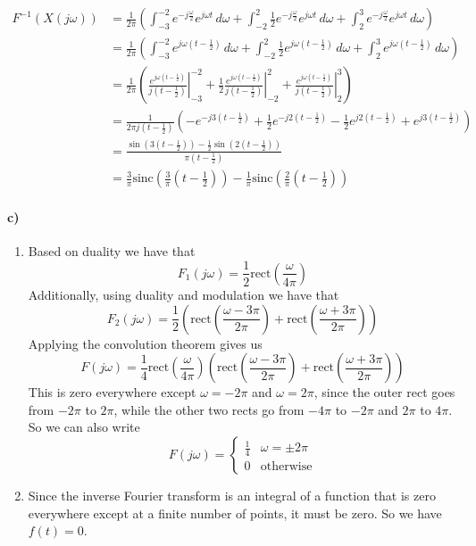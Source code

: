 \documentclass[12pt]{article}
\begin{document}
\begin{align*}
    F^{-1}(X(j\omega))&=\frac{1}{2\pi}\left(\int_{-3}^{-2} e^{-j\frac{\omega}{2}} e^{j\omega t}\,d\omega + \int_{-2}^2 \frac{1}{2}e^{-j\frac{\omega}{2}} e^{j\omega t}\,d\omega
    + \int_2^3 e^{-j\frac{\omega}{2}} e^{j\omega t}\,d\omega\right)\\
    &=\frac{1}{2\pi}\left(\int_{-3}^{-2} e^{j\omega \left(t-\frac{1}{2}\right)}\,d\omega + \int_{-2}^2 \frac{1}{2}e^{j\omega \left(t-\frac{1}{2}\right)}\,d\omega
    + \int_2^3 e^{j\omega \left(t-\frac{1}{2}\right)}\,d\omega\right)\\
    &=\frac{1}{2\pi}\left(\left.\frac{e^{j\omega \left(t-\frac{1}{2}\right)}}{j\left(t-\frac{1}{2}\right)}\right|_{-3}^{-2}
    + \frac{1}{2}\left.\frac{e^{j\omega \left(t-\frac{1}{2}\right)}}{j\left(t-\frac{1}{2}\right)}\right|_{-2}^2
    + \left.\frac{e^{j\omega \left(t-\frac{1}{2}\right)}}{j\left(t-\frac{1}{2}\right)}\right|_2^3\right)\\
    &=\frac{1}{2\pi j\left(t-\frac{1}{2}\right)}\left(-e^{-j3\left(t-\frac{1}{2}\right)}+\frac{1}{2}e^{-j2\left(t-\frac{1}{2}\right)}-\frac{1}{2}e^{j2\left(t-\frac{1}{2}\right)}
    +e^{j3\left(t-\frac{1}{2}\right)}\right)\\
    &=\frac{\sin\left(3\left(t-\frac{1}{2}\right)\right)-\frac{1}{2}\sin\left(2\left(t-\frac{1}{2}\right)\right)}{\pi\left(t-\frac{1}{2}\right)}\\
    &=\frac{3}{\pi}\text{sinc}\left(\frac{3}{\pi}\left(t-\frac{1}{2}\right)\right)-\frac{1}{\pi}\text{sinc}\left(\frac{2}{\pi}\left(t-\frac{1}{2}\right)\right)
\end{align*}

\paragraph{c)}

\begin{enumerate}
    \item Based on duality we have that
    \[F_1(j\omega)=\frac{1}{2}\text{rect}\left(\frac{\omega}{4\pi}\right)\]
    Additionally, using duality and modulation we have that
    \[F_2(j\omega)=\frac{1}{2}\left(\text{rect}\left(\frac{\omega-3\pi}{2\pi}\right)+\text{rect}\left(\frac{\omega+3\pi}{2\pi}\right)\right)\]
    Applying the convolution theorem gives us
    \[F(j\omega)=\frac{1}{4}\text{rect}\left(\frac{\omega}{4\pi}\right)\left(\text{rect}\left(\frac{\omega-3\pi}{2\pi}\right)+\text{rect}\left(\frac{\omega+3\pi}{2\pi}\right)\right)\]
    This is zero everywhere except \(\omega=-2\pi\) and \(\omega=2\pi\), since the outer rect goes from \(-2\pi\) to \(2\pi\), while the other two rects go from \(-4\pi\) to \(-2\pi\) and
    \(2\pi\) to \(4\pi\). So we can also write
    \[F(j\omega)=\begin{cases}
        \frac{1}{4} & \omega=\pm 2\pi\\
        0 & \text{otherwise}
    \end{cases}\]
    \item Since the inverse Fourier transform is an integral of a function that is zero everywhere except at a finite number of points, it must be zero. So we have \(f(t)=0\).
\end{enumerate}
\end{document}
